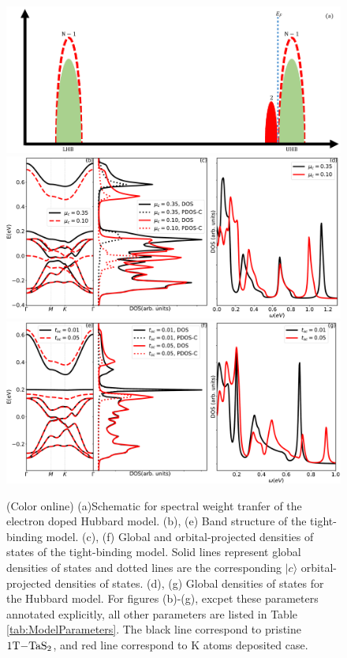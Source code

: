 \documentclass[aps,prl,twocolumn,superscriptaddress]{revtex4}
\begin{document}
\begin{figure}
\includegraphics[width=\columnwidth]{AdditionalExcitation.pdf}
\includegraphics[width=\columnwidth]{ENUM=13.pdf}
\includegraphics[width=\columnwidth]{ENUM=11.pdf}
\caption{\label{fig:TheoreticalFormalism}
(Color online) (a)Schematic for spectral weight tranfer of the electron doped Hubbard model. (b), (e) Band structure of the tight-binding model. (c), (f) Global and orbital-projected densities of states of the tight-binding model. Solid lines represent global densities of states and dotted lines are the corresponding $\vert c \rangle$ orbital-projected densities of states. (d), (g) Global densities of states for the Hubbard model. For figures (b)-(g), excpet these parameters annotated explicitly, all other parameters are listed in Table \ref{tab:ModelParameters}. The black line correspond to pristine $1\mathrm{T}\text{\ensuremath{-}}{\mathrm{TaS}}_2$, and red line correspond to K atoms deposited case.
}
\end{figure}
\end{document}

